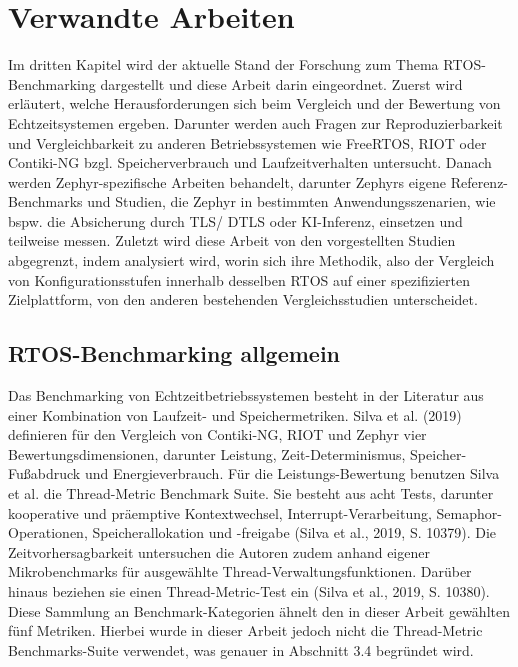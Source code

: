 \chapter{Verwandte Arbeiten}

Im dritten Kapitel wird der aktuelle Stand der Forschung zum Thema RTOS-Benchmarking dargestellt und diese Arbeit darin eingeordnet. Zuerst wird erl{\"a}utert, welche Herausforderungen sich beim Vergleich und der Bewertung von Echtzeitsystemen ergeben. Darunter werden auch Fragen zur Reproduzierbarkeit und Vergleichbarkeit zu anderen Betriebssystemen wie FreeRTOS, RIOT oder Contiki-NG bzgl. Speicherverbrauch und Laufzeitverhalten untersucht. Danach werden Zephyr-spezifische Arbeiten behandelt, darunter Zephyrs eigene Referenz-Benchmarks und Studien, die Zephyr in bestimmten Anwendungsszenarien, wie bspw. die Absicherung durch TLS/ DTLS oder KI-Inferenz, einsetzen und teilweise messen. Zuletzt wird diese Arbeit von den vorgestellten Studien abgegrenzt, indem analysiert wird, worin sich ihre Methodik, also der Vergleich von Konfigurationsstufen innerhalb desselben RTOS auf einer spezifizierten Zielplattform, von den anderen bestehenden Vergleichsstudien unterscheidet.

\section{RTOS-Benchmarking allgemein}
Das Benchmarking von Echtzeitbetriebssystemen besteht in der Literatur aus einer Kombination von Laufzeit- und Speichermetriken. Silva et al. (2019) definieren f{\"u}r den Vergleich von Contiki-NG, RIOT und Zephyr vier Bewertungsdimensionen, darunter Leistung, Zeit-Determinismus, Speicher-Fu{\ss}abdruck und Energieverbrauch. F{\"u}r die Leistungs-Bewertung benutzen Silva et al. die Thread-Metric Benchmark Suite. Sie besteht aus acht Tests, darunter kooperative und pr{\"a}emptive Kontextwechsel, Interrupt-Verarbeitung, Semaphor-Operationen, Speicherallokation und -freigabe (Silva et al., 2019, S. 10379). Die Zeitvorhersagbarkeit untersuchen die Autoren zudem anhand eigener Mikrobenchmarks f{\"u}r ausgew{\"a}hlte Thread-Verwaltungsfunktionen. Dar{\"u}ber hinaus beziehen sie einen Thread-Metric-Test ein (Silva et al., 2019, S. 10380). Diese Sammlung an Benchmark-Kategorien {\"a}hnelt den in dieser Arbeit gew{\"a}hlten f{\"u}nf Metriken. Hierbei wurde in dieser Arbeit jedoch nicht die Thread-Metric Benchmarks-Suite verwendet, was genauer in Abschnitt 3.4 begr{\"u}ndet wird.

